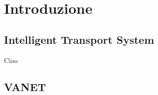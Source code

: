 \chapter{Introduzione}

\section{Intelligent Transport System}
Ciao
\lipsum[1-10]
\cite{6686471}

\section{VANET}